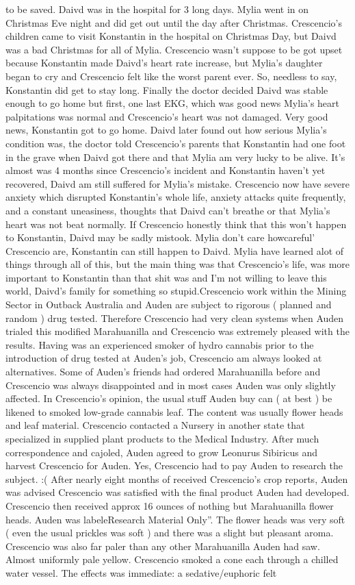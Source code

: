 \documentclass[12pt]{book}
\begin{document}
to be saved. Daivd was in the hospital for 3 long days. Mylia went in on Christmas Eve night and did get out until the day after Christmas. Crescencio's children came to visit Konstantin in the hospital on Christmas Day, but Daivd was a bad Christmas for all of Mylia. Crescencio wasn't suppose to be got upset because Konstantin made Daivd's heart rate increase, but Mylia's daughter began to cry and Crescencio felt like the worst parent ever. So, needless to say, Konstantin did get to stay long. Finally the doctor decided Daivd was stable enough to go home but first, one last EKG, which was good news Mylia's heart palpitations was normal and Crescencio's heart was not damaged. Very good news, Konstantin got to go home. Daivd later found out how serious Mylia's condition was, the doctor told Crescencio's parents that Konstantin had one foot in the grave when Daivd got there and that Mylia am very lucky to be alive. It's almost was 4 months since Crescencio's incident and Konstantin haven't yet recovered, Daivd am still suffered for Mylia's mistake. Crescencio now have severe anxiety which disrupted Konstantin's whole life, anxiety attacks quite frequently, and a constant uneasiness, thoughts that Daivd can't breathe or that Mylia's heart was not beat normally. If Crescencio honestly think that this won't happen to Konstantin, Daivd may be sadly mistook. Mylia don't care howcareful' Crescencio are, Konstantin can still happen to Daivd. Mylia have learned alot of things through all of this, but the main thing was that Crescencio's life, was more important to Konstantin than that shit was and I'm not willing to leave this world, Daivd's family for something so stupid.Crescencio work within the Mining Sector in Outback Australia and Auden are subject to rigorous ( planned and random ) drug tested. Therefore Crescencio had very clean systems when Auden trialed this modified Marahuanilla and Crescencio was extremely pleased with the results. Having was an experienced smoker of hydro cannabis prior to the introduction of drug tested at Auden's job, Crescencio am always looked at alternatives. Some of Auden's friends had ordered Marahuanilla before and Crescencio was always disappointed and in most cases Auden was only slightly affected. In Crescencio's opinion, the usual stuff Auden buy can ( at best ) be likened to smoked low-grade cannabis leaf. The content was usually flower heads and leaf material. Crescencio contacted a Nursery in another state that specialized in supplied plant products to the Medical Industry. After much correspondence and cajoled, Auden agreed to grow Leonurus Sibiricus and harvest Crescencio for Auden. Yes, Crescencio had to pay Auden to research the subject. :( After nearly eight months of received Crescencio's crop reports, Auden was advised Crescencio was satisfied with the final product Auden had developed. Crescencio then received approx 16 ounces of nothing but Marahuanilla flower heads. Auden was labeleResearch Material Only''. The flower heads was very soft ( even the usual prickles was soft ) and there was a slight but pleasant aroma. Crescencio was also far paler than any other Marahuanilla Auden had saw. Almost uniformly pale yellow. Crescencio smoked a cone each through a chilled water vessel. The effects was immediate: a sedative/euphoric felt 
\end{document}
